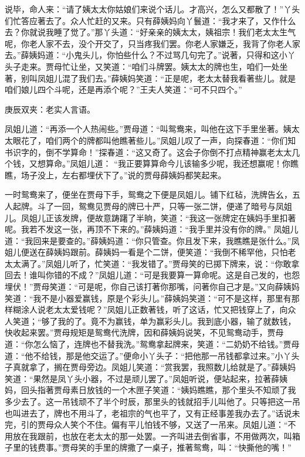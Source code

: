 \begin{parag}
    说毕，命人来：“请了姨太太你姑娘们来说个话儿。才高兴，怎么又都散了！”丫头们忙答应著去了。众人忙赶的又来。只有薛姨妈向丫鬟道：“我才来了，又作什么去？你就说我睡了觉了。”那丫头道：“好亲亲的姨太太，姨祖宗！我们老太太生气呢，你老人家不去，没个开交了，只当疼我们罢。你老人家嫌乏，我背了你老人家去。”薛姨妈道：“小鬼头儿，你怕些什么？不过骂几句完了。”说著，只得和这小丫头子走来。贾母忙让坐，又笑道：“咱们斗牌罢。姨太太的牌也生，咱们一处坐著，别叫凤姐儿混了我们去。”薛姨妈笑道：“正是呢，老太太替我看著些儿。就是咱们娘儿四个斗呢，还是再添个呢？”王夫人笑道：“可不只四个。”\begin{note}庚辰双夹：老实人言语。\end{note}凤姐儿道：“再添一个人热闹些。”贾母道：“叫鸳鸯来，叫他在这下手里坐著。姨太太眼花了，咱们两个的牌都叫他瞧著些儿。”凤姐儿叹了一声，向探春道：“你们知书识字的，倒不学算命！”探春道：“这又奇了。这会子你倒不打点精神赢老太太几个钱，又想算命。”凤姐儿道： “我正要算算命今儿该输多少呢，我还想赢呢！你瞧瞧，场子没上，左右都埋伏下了。”说的贾母薛姨妈都笑起来。
\end{parag}


\begin{parag}
    一时鸳鸯来了，便坐在贾母下手，鸳鸯之下便是凤姐儿。铺下红毡，洗牌告幺，五人起牌。斗了一回，鸳鸯见贾母的牌已十严，只等一张二饼，便递了暗号与凤姐儿。凤姐儿正该发牌，便故意踌躇了半晌，笑道：“我这一张牌定在姨妈手里扣著呢。我若不发这一张，再顶不下来的。”薛姨妈道：“我手里并没有你的牌。” 凤姐儿道：“我回来是要查的。”薛姨妈道：“你只管查。你且发下来，我瞧瞧是张什么。”凤姐儿便送在薛姨妈跟前。薛姨妈一看是个二饼，便笑道：“我倒不稀罕他，只怕老太太满了。”凤姐儿听了，忙笑道：“我发错了。”贾母笑的已掷下牌来，说：“你敢拿回去！谁叫你错的不成？”凤姐儿道：“可是我要算一算命呢。这是自己发的，也怨埋伏！”贾母笑道：“可是呢，你自己该打著你那嘴，问著你自己才是。”又向薛姨妈笑道：“我不是小器爱赢钱，原是个彩头儿。”薛姨妈笑道：“可不是这样，那里有那样糊涂人说老太太爱钱呢？”凤姐儿正数著钱，听了这话，忙又把钱穿上了，向众人笑道；“够了我的了。竟不为赢钱，单为赢彩头儿。我到底小器，输了就数钱，快收起来罢。”贾母规矩是鸳鸯代洗牌，因和薛姨妈说笑，不见鸳鸯动手，贾母道：“你怎么恼了，连牌也不替我洗。”鸳鸯拿起牌来，笑道：“二奶奶不给钱。”贾母道：“他不给钱，那是他交运了。”便命小丫头子：“把他那一吊钱都拿过来。”小丫头子真就拿了，搁在贾母旁边。凤姐儿笑道：“赏我罢，我照数儿给就是了。”薛姨妈笑道：“果然是凤丫头小器，不过是顽儿罢了。”凤姐听说，便站起来，拉著薛姨妈，回头指著贾母素日放钱的一个木匣子笑道：“姨妈瞧瞧，那个里头不知顽了我多少去了。这一吊钱顽不了半个时辰，那里头的钱就招手儿叫他了。只等把这一吊也叫进去了，牌也不用斗了，老祖宗的气也平了，又有正经事差我办去了。”话说未完，引的贾母众人笑个不住。偏有平儿怕钱不够，又送了一吊来。凤姐儿道：“不用放在我跟前，也放在老太太的那一处罢。一齐叫进去倒省事，不用做两次，叫箱子里的钱费事。”贾母笑的手里的牌撒了一桌子，推著鸳鸯，叫：“快撕他的嘴！”
\end{parag}



